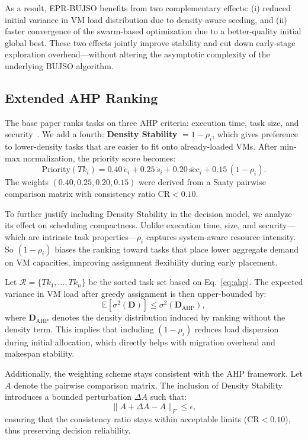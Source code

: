 \documentclass[journal]{IEEEtran}
\begin{document}
As a result, EPR-BUJSO benefits from two complementary effects: (i) reduced initial variance in VM load distribution due to density-aware seeding, and (ii) faster convergence of the swarm-based optimization due to a better-quality initial global best. These two effects jointly improve stability and cut down early-stage exploration overhead---without altering the asymptotic complexity of the underlying BUJSO algorithm.

\subsection{Extended AHP Ranking}
\label{sec:ahp}

The base paper ranks tasks on three AHP criteria: execution time, task size, and security~\cite{pachipala2024}. We add a fourth: \textbf{Density Stability} $=1-\rho_i$, which gives preference to lower-density tasks that are easier to fit onto already-loaded VMs. After min-max normalization, the priority score becomes:
\begin{equation}
  \mathrm{Priority}(Tk_i)
  =0.40\,\tilde{e}_i+0.25\,\tilde{s}_i+0.20\,\widetilde{\mathrm{sec}}_i+0.15\,(1-\rho_i).
  \label{eq:ahp}
\end{equation}
The weights $(0.40,0.25,0.20,0.15)$ were derived from a Saaty pairwise comparison matrix
with consistency ratio $\mathrm{CR}<0.10$.

To further justify including Density Stability in the decision model, we analyze its effect on scheduling compactness. Unlike execution time, size, and security---which are intrinsic task properties---$\rho_i$ captures system-aware resource intensity. So $(1-\rho_i)$ biases the ranking toward tasks that place lower aggregate demand on VM capacities, improving assignment flexibility during early placement.

Let $\mathcal{R}=\{Tk_1,\ldots,Tk_n\}$ be the sorted task set based on Eq.~\eqref{eq:ahp}. The expected variance in VM load after greedy assignment is then upper-bounded by:
\begin{equation}
\mathbb{E}[\sigma^2(\mathbf{D})] \le \sigma^2(\mathbf{D}_{\text{AHP}}),
\end{equation}
where $\mathbf{D}_{\text{AHP}}$ denotes the density distribution induced by ranking without the density term. This implies that including $(1-\rho_i)$ reduces load dispersion during initial allocation, which directly helps with migration overhead and makespan stability.

Additionally, the weighting scheme stays consistent with the AHP framework. Let $A$ denote the pairwise comparison matrix. The inclusion of Density Stability introduces a bounded perturbation $\Delta A$ such that:
\begin{equation}
\|A + \Delta A - A\|_F \le \epsilon,
\end{equation}
ensuring that the consistency ratio stays within acceptable limits ($\mathrm{CR} < 0.10$), thus preserving decision reliability.
\end{document}
